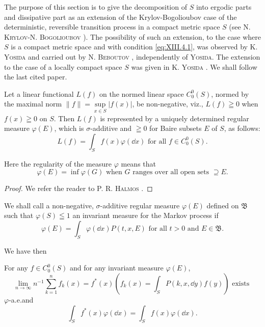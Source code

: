 The purpose of this section is to give the decomposition of $S$ into ergodic parts and dissipative part as an extension of the Krylov-Bogolioubov case of the deterministic, reversible transition process in a compact metric space $S$ (see N. \textsc{Krylov}-N. \textsc{Bogolioubov} \cite{krein169}). The possibility of such an extension, to the case where $S$ is a compact metric space and with condition \eqref{eq:XIII.4.1}, was observed by K. \textsc{Yosida} \cite{yosida360} and carried out by N. \textsc{Beboutov} \cite{beboutov12}, independently of \textsc{Yosida}. The extension to the case of a locally compact space $S$ was given in K. \textsc{Yosida} \cite{yosida362}. We shall follow the last cited paper. 

\begin{lemma}\label{lem:XIII.4.Lemma.1} Let a linear functional $L(f)$ on the normed linear space $C_0^0(S)$, normed by the maximal norm $\|f\| = \sup\limits_{x \in S} |f(x)|$, be non-negative, viz., $L(f) \geqq 0$ when $f(x) \geqq 0$ on $S$. Then $L(f)$ is represented by a uniquely determined regular measure $\varphi(E)$, which is $\sigma$-additive and $\geqq 0$ for Baire subsets $E$ of $S$, as follows: 
\begin{equation}\label{eq:XIII.4.2}
L (f) = \int_{S} f (x) \varphi (\dd x) \text{ for all } f \in C _{0} ^{0} (S).
\end{equation}
\end{lemma}

Here the regularity of the measure $\varphi$ means that 
\begin{equation}\label{eq:XIII.4.3}
\varphi (E) = \inf \varphi (G) \text{ when } G \text{ ranges over all open sets } \supseteq E.
\end{equation}

\begin{proof}
 We refer the reader to P. R. \textsc{Halmos} \cite{halmos92}. 
\end{proof}

We shall call a non-negative, $\sigma$-additive regular measure $\varphi(E)$ defined on $\mathfrak{B}$ such that $\varphi(S) \leqq 1$ an invariant measure for the Markov process if 
\begin{equation}\label{eq:XIII.4.4}
\varphi (E) = \int_{S} \varphi (\dd x) P (t, x, E) \text{ for all } t > 0 \text{ and } E \in \mathfrak {B}.
\end{equation}

We have then 

\begin{lemma}\label{lem:XIII.4.Lemma.2} For any $f \in C_0^0(S)$ and for any invariant measure $\varphi(E)$, 
\begin{equation}\label{eq:XIII.4.5}
\lim\limits _{n \rightarrow \infty} n ^{-1} \sum\limits_{k=1} ^{n} f _{k} (x) = f ^{*} (x) \left(f _{k} (x) = \int_{S} P (k, x, \dd y) f (y)\right) \text{ exists }
\end{equation}
$\varphi$-a.e.and 
\begin{equation}\label{eq:XIII.4.6}
\int_{S} f ^{*} (x) \varphi (\dd x) = \int_{S} f (x) \varphi (\dd x).
\end{equation}
\end{lemma}

